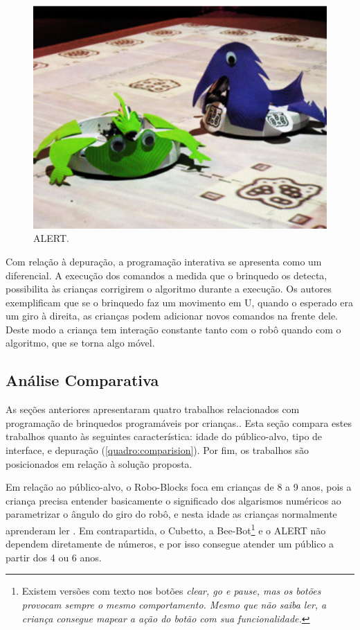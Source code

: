 \begin{figure}[!h]
    \centering
    \includegraphics[width=.6\linewidth,fbox]{figs/alert.png}
    \caption{ALERT.}
    \label{fig:alert}
\end{figure}

Com relação à depuração, a programação interativa se apresenta como um diferencial. A execução dos comandos a medida que o brinquedo os detecta, possibilita às crianças corrigirem o algoritmo durante a execução. Os autores exemplificam que se o brinquedo faz um movimento em U, quando o esperado era um giro à direita, as crianças podem adicionar novos comandos na frente dele. Deste modo a criança tem interação constante tanto com o robô quando com o algoritmo, que se torna algo móvel. 

\subsection{Análise Comparativa}

As seções anteriores apresentaram quatro trabalhos relacionados com programação de brinquedos programáveis por crianças.. Esta seção compara estes trabalhos quanto às seguintes característica: idade do público-alvo, tipo de interface, e depuração (\autoref{quadro:comparision}). Por fim, os trabalhos são posicionados em relação à solução proposta.

Em relação ao público-alvo, o Robo-Blocks foca em crianças de 8 a 9 anos, pois a criança precisa entender basicamente o significado dos algarismos numéricos ao parametrizar o ângulo do giro do robô, e nesta idade as crianças normalmente aprenderam ler \cite{committee_on_the_prevention_of_reading_difficulties_in_young_children_preventing_1998}. Em contrapartida, o Cubetto, a Bee-Bot\footnote{Existem versões com texto nos botões \it{clear}, \it{go} e \it{pause}, mas os botões provocam sempre o mesmo comportamento. Mesmo que não saiba ler, a criança consegue mapear a ação do botão com sua funcionalidade.} e o ALERT não dependem diretamente de números, e por isso consegue atender um público a partir dos 4 ou 6 anos.

